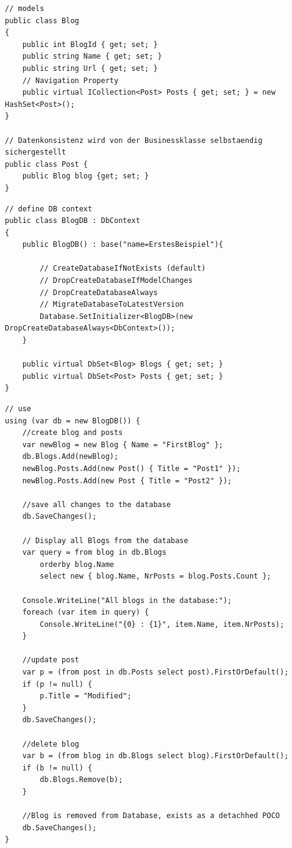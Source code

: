 \begin{lstlisting}	
// models
public class Blog
{
	public int BlogId { get; set; }
	public string Name { get; set; }
	public string Url { get; set; }
	// Navigation Property
	public virtual ICollection<Post> Posts { get; set; } = new HashSet<Post>();
}

// Datenkonsistenz wird von der Businessklasse selbstaendig sichergestellt
public class Post {
	public Blog blog {get; set; }
}

\end{lstlisting}

\begin{lstlisting}	
// define DB context
public class BlogDB : DbContext
{
	public BlogDB() : base("name=ErstesBeispiel"){
	
		// CreateDatabaseIfNotExists (default)
		// DropCreateDatabaseIfModelChanges
		// DropCreateDatabaseAlways
		// MigrateDatabaseToLatestVersion
		Database.SetInitializer<BlogDB>(new DropCreateDatabaseAlways<DbContext>());
	}
	
	public virtual DbSet<Blog> Blogs { get; set; }
	public virtual DbSet<Post> Posts { get; set; }
}

\end{lstlisting}

\begin{lstlisting}
// use
using (var db = new BlogDB()) {
	//create blog and posts
	var newBlog = new Blog { Name = "FirstBlog" };
	db.Blogs.Add(newBlog);
	newBlog.Posts.Add(new Post() { Title = "Post1" });
	newBlog.Posts.Add(new Post { Title = "Post2" });
	
	//save all changes to the database
	db.SaveChanges();
	
	// Display all Blogs from the database 
	var query = from blog in db.Blogs
		orderby blog.Name
		select new { blog.Name, NrPosts = blog.Posts.Count };
	
	Console.WriteLine("All blogs in the database:");
	foreach (var item in query) {
		Console.WriteLine("{0} : {1}", item.Name, item.NrPosts);
	}
	
	//update post
	var p = (from post in db.Posts select post).FirstOrDefault();
	if (p != null) {
		p.Title = "Modified";
	}
	db.SaveChanges();

	//delete blog
	var b = (from blog in db.Blogs select blog).FirstOrDefault();
	if (b != null) {
		db.Blogs.Remove(b);
	}

	//Blog is removed from Database, exists as a detachhed POCO
	db.SaveChanges();
}
\end{lstlisting}

